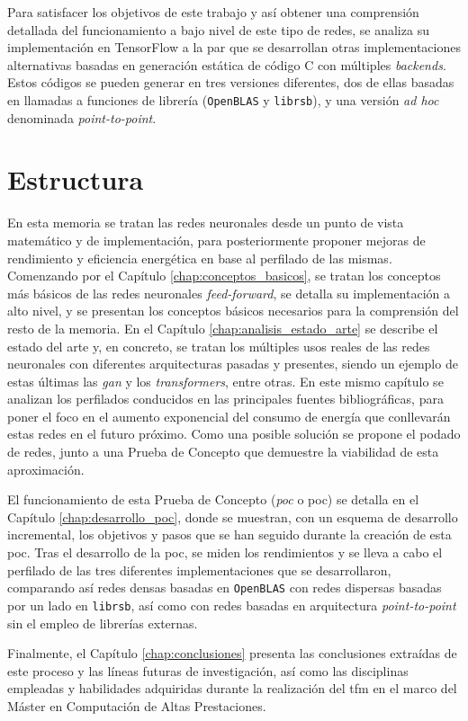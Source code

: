 Para satisfacer los objetivos de este trabajo y así obtener una comprensión detallada del funcionamiento a bajo nivel de este tipo de redes, se analiza su implementación en TensorFlow a la par que se desarrollan otras implementaciones alternativas basadas en generación estática de código C con múltiples \textit{backends}. Estos códigos se pueden generar en tres versiones diferentes, dos de ellas basadas en llamadas a funciones de librería (\texttt{OpenBLAS} y \texttt{librsb}), y una versión \textit{ad hoc} denominada \textit{point-to-point}.

\section{Estructura}
\label{sec:estructura}
En esta memoria se tratan las redes neuronales desde un punto de vista matemático y de implementación, para posteriormente proponer mejoras de rendimiento y eficiencia energética en base al perfilado de las mismas. Comenzando por el Capítulo \ref{chap:conceptos_basicos}, se tratan los conceptos más básicos de las redes neuronales \textit{feed-forward}, se detalla su implementación a alto nivel, y se presentan los conceptos básicos necesarios para la comprensión del resto de la memoria. En el Capítulo \ref{chap:analisis_estado_arte} se describe el estado del arte y, en concreto, se tratan los múltiples usos reales de las redes neuronales con diferentes arquitecturas pasadas y presentes, siendo un ejemplo de estas últimas las \textit{\acrlong{gan}} y los \textit{transformers}, entre otras. En este mismo capítulo se analizan los perfilados conducidos en las principales fuentes bibliográficas, para poner el foco en el aumento exponencial del consumo de energía que conllevarán estas redes en el futuro próximo. Como una posible solución se propone el podado de redes, junto a una Prueba de Concepto que demuestre la viabilidad de esta aproximación.

El funcionamiento de esta Prueba de Concepto (\textit{\acrlong{poc}} o \acrshort{poc}) se detalla en el Capítulo \ref{chap:desarrollo_poc}, donde se muestran, con un esquema de desarrollo incremental, los objetivos y pasos que se han seguido durante la creación de esta \acrshort{poc}. Tras el desarrollo de la \acrshort{poc}, se miden los rendimientos y se lleva a cabo el perfilado de las tres diferentes implementaciones que se desarrollaron, comparando así redes densas basadas en \texttt{OpenBLAS} con redes dispersas basadas por un lado en \texttt{librsb}, así como con redes basadas en arquitectura \textit{point-to-point} sin el empleo de librerías externas.

Finalmente, el Capítulo \ref{chap:conclusiones} presenta las conclusiones extraídas de este proceso y las líneas futuras de investigación, así como las disciplinas empleadas y habilidades adquiridas durante la realización del \acrshort{tfm} en el marco del Máster en Computación de Altas Prestaciones.